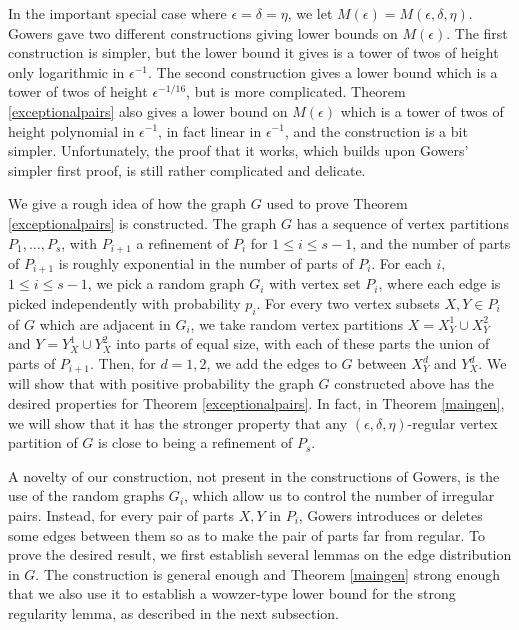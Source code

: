 \documentclass[11pt]{article}
\begin{document}
In the important special case where $\epsilon = \delta = \eta$, we let
$M(\epsilon)= M(\epsilon, \delta, \eta)$. Gowers \cite{Go} gave two different
constructions giving lower bounds on $M(\epsilon)$. The first construction is
simpler, but the lower bound it gives is a tower of twos of height only
logarithmic in $\epsilon^{-1}$. The second construction gives a lower bound
which is a tower of twos of height $\epsilon^{-1/16}$, but is more complicated.
Theorem \ref{exceptionalpairs} also gives a lower bound on $M(\epsilon)$ which
is a tower of twos of height polynomial in $\epsilon^{-1}$, in fact linear in
$\epsilon^{-1}$, and the construction is a bit simpler. Unfortunately, the
proof that it works, which builds upon Gowers' simpler first proof, is still
rather complicated and delicate.

We give a rough idea of how the graph $G$ used to prove Theorem
\ref{exceptionalpairs} is constructed. The graph $G$ has a sequence of vertex
partitions $P_1,\ldots,P_s$, with $P_{i+1}$ a refinement of $P_i$ for $1 \leq i
\leq s-1$, and the number of parts of $P_{i+1}$ is roughly exponential in the
number of parts of $P_i$. For each $i$, $1 \leq i \leq s-1$, we pick a random
graph $G_i$ with vertex set $P_i$, where each edge is picked independently with probability $p_i$. For every two vertex subsets $X,Y \in P_i$ of
$G$ which are adjacent in $G_i$, we take random vertex partitions $X=X_Y^1 \cup
X_Y^2$ and $Y=Y_X^1 \cup Y_X^2$ into parts of equal size, with each of these
parts the union of parts of $P_{i+1}$. Then, for $d=1,2$, we add the edges to
$G$ between $X_Y^d$ and $Y_X^d$. We will show that with positive probability
the graph $G$ constructed above has the desired properties for Theorem
\ref{exceptionalpairs}. In fact, in Theorem \ref{maingen}, we will show that it
has the stronger property that any $(\epsilon,\delta,\eta)$-regular vertex
partition of $G$ is close to being a refinement of $P_s$.

A novelty of our construction, not present in the constructions of Gowers, is
the use of the random graphs $G_i$, which allow us to control the number of
irregular pairs. Instead, for every pair of parts $X,Y$ in $P_i$, Gowers
\cite{Go} introduces or deletes some edges between them so as to make the pair
of parts far from regular. To prove the desired result, we first establish
several lemmas on the edge distribution in $G$. The construction is general
enough and Theorem \ref{maingen} strong enough that we also use it to establish
a wowzer-type lower bound for the strong regularity lemma, as described in the
next subsection.
\end{document}
